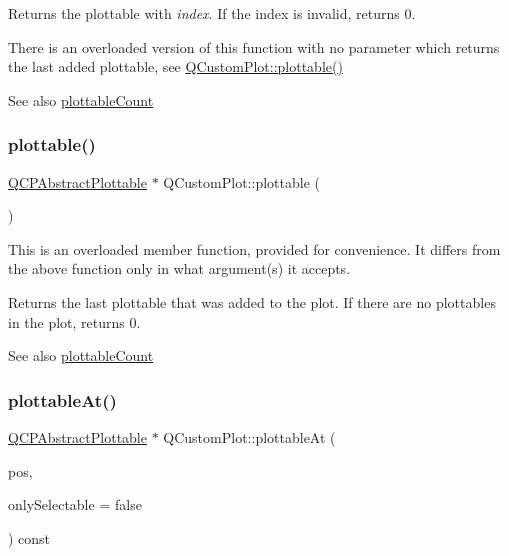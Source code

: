 Returns the plottable with {\itshape index}. If the index is invalid, returns 0.

There is an overloaded version of this function with no parameter which returns the last added plottable, see \hyperlink{class_q_custom_plot_adea38bdc660da9412ba69fb939031567}{Q\+Custom\+Plot\+::plottable()}

\begin{DoxySeeAlso}{See also}
\hyperlink{class_q_custom_plot_a5f4f15991c14bf9ad659bb2a19dfbed4}{plottable\+Count} 
\end{DoxySeeAlso}
\mbox{\label{class_q_custom_plot_adea38bdc660da9412ba69fb939031567}} 
\subsubsection{\texorpdfstring{plottable()}{plottable()}\hspace{0.1cm}{\footnotesize\ttfamily [2/2]}}
{\footnotesize\ttfamily \hyperlink{class_q_c_p_abstract_plottable}{Q\+C\+P\+Abstract\+Plottable} $\ast$ Q\+Custom\+Plot\+::plottable (\begin{DoxyParamCaption}{ }\end{DoxyParamCaption})}

This is an overloaded member function, provided for convenience. It differs from the above function only in what argument(s) it accepts.

Returns the last plottable that was added to the plot. If there are no plottables in the plot, returns 0.

\begin{DoxySeeAlso}{See also}
\hyperlink{class_q_custom_plot_a5f4f15991c14bf9ad659bb2a19dfbed4}{plottable\+Count} 
\end{DoxySeeAlso}
\mbox{\label{class_q_custom_plot_acddbbd8b16dd633f0d94e5a736fbd8cf}} 
\subsubsection{\texorpdfstring{plottable\+At()}{plottableAt()}}
{\footnotesize\ttfamily \hyperlink{class_q_c_p_abstract_plottable}{Q\+C\+P\+Abstract\+Plottable} $\ast$ Q\+Custom\+Plot\+::plottable\+At (\begin{DoxyParamCaption}\item[{const Q\+PointF \&}]{pos,  }\item[{bool}]{only\+Selectable = {\ttfamily false} }\end{DoxyParamCaption}) const}

